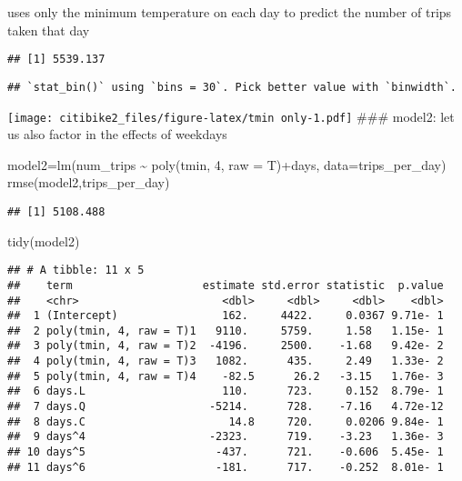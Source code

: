 \documentclass[
]{article}
\newenvironment{Shaded}{\begin{snugshade}}{\end{snugshade}}
\newcommand{\AttributeTok}[1]{\textcolor[rgb]{0.77,0.63,0.00}{#1}}
\newcommand{\DecValTok}[1]{\textcolor[rgb]{0.00,0.00,0.81}{#1}}
\newcommand{\FunctionTok}[1]{\textcolor[rgb]{0.00,0.00,0.00}{#1}}
\newcommand{\NormalTok}[1]{#1}
\newcommand{\OtherTok}[1]{\textcolor[rgb]{0.56,0.35,0.01}{#1}}
\newcommand{\SpecialCharTok}[1]{\textcolor[rgb]{0.00,0.00,0.00}{#1}}
\begin{document}
uses only the minimum temperature on each day to predict the number of
trips taken that day

\begin{verbatim}
## [1] 5539.137
\end{verbatim}

\begin{verbatim}
## `stat_bin()` using `bins = 30`. Pick better value with `binwidth`.
\end{verbatim}

\texttt{[image: citibike2\_files/figure-latex/tmin only-1.pdf]} \#\#\#
model2: let us also factor in the effects of weekdays

\begin{Shaded}
\begin{Highlighting}[]
\NormalTok{model2}\OtherTok{=}\FunctionTok{lm}\NormalTok{(num\_trips }\SpecialCharTok{\textasciitilde{}} \FunctionTok{poly}\NormalTok{(tmin, }\DecValTok{4}\NormalTok{, }\AttributeTok{raw =}\NormalTok{ T)}\SpecialCharTok{+}\NormalTok{days, }\AttributeTok{data=}\NormalTok{trips\_per\_day)}
\FunctionTok{rmse}\NormalTok{(model2,trips\_per\_day)}
\end{Highlighting}
\end{Shaded}

\begin{verbatim}
## [1] 5108.488
\end{verbatim}

\begin{Shaded}
\begin{Highlighting}[]
\FunctionTok{tidy}\NormalTok{(model2)}
\end{Highlighting}
\end{Shaded}

\begin{verbatim}
## # A tibble: 11 x 5
##    term                    estimate std.error statistic  p.value
##    <chr>                      <dbl>     <dbl>     <dbl>    <dbl>
##  1 (Intercept)                162.     4422.     0.0367 9.71e- 1
##  2 poly(tmin, 4, raw = T)1   9110.     5759.     1.58   1.15e- 1
##  3 poly(tmin, 4, raw = T)2  -4196.     2500.    -1.68   9.42e- 2
##  4 poly(tmin, 4, raw = T)3   1082.      435.     2.49   1.33e- 2
##  5 poly(tmin, 4, raw = T)4    -82.5      26.2   -3.15   1.76e- 3
##  6 days.L                     110.      723.     0.152  8.79e- 1
##  7 days.Q                   -5214.      728.    -7.16   4.72e-12
##  8 days.C                      14.8     720.     0.0206 9.84e- 1
##  9 days^4                   -2323.      719.    -3.23   1.36e- 3
## 10 days^5                    -437.      721.    -0.606  5.45e- 1
## 11 days^6                    -181.      717.    -0.252  8.01e- 1
\end{verbatim}
\end{document}
